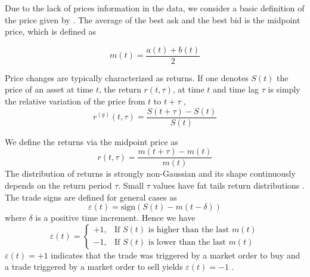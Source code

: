 Due to the lack of prices information in the data, we consider a basic
definition of the price given by
\cite{patterns_forex,political_forex,forex_liquidity}. The average of the best
ask and the best bid is the midpoint price, which is defined as
\cite{subtle_nature,Bouchaud_2004,teach_spread,large_prices_changes,my_paper_response_financial,em_stylized_facts,prop_order_book,stat_theory}

\begin{equation}
    m \left(t\right) = \frac{a\left(t\right) + b\left(t\right)}{2}
\end{equation}

Price changes are typically characterized as returns. If one denotes
$S\left( t\right)$ the price of an asset at time $t$, the return
$r\left(t, \tau\right)$, at time $t$ and time lag $\tau$ is simply the relative
variation of the price from $t$ to $t + \tau$
\cite{subtle_nature,empirical_facts,asynchrony_effects_corr,tick_size_impact,causes_epps_effect,non_stationarity},
\begin{equation}\label{eq:return_general}
    r^{\left(g\right)} \left(t, \tau \right) = \frac{S\left(t + \tau\right)
    - S\left(t\right)}{S\left(t\right)}
\end{equation}

We define the returns via the midpoint price as
\begin{equation}\label{eq:midpoint_price_return}
    r\left(t,\tau\right) = \frac{m\left(t+\tau\right)-m\left(t\right)}
    {m\left(t\right)}
\end{equation}
The distribution of returns is strongly non-Gaussian and its shape continuously
depends on the return period $\tau$. Small $\tau$ values have fat tails return
distributions \cite{subtle_nature}. The trade signs are defined for general
cases as
\begin{equation}\label{eq:trade_sign_general}
    \varepsilon\left(t\right)=\text{sign}\left(S\left(t\right)
    -m\left(t-\delta\right)\right)
\end{equation}
where $\delta$ is a positive time increment. Hence we have
\begin{equation}\label{eq:trade_sign_results}
    \varepsilon\left(t\right)=\left\{
    \begin{array}{cc}
    +1, & \text{If } S\left(t\right)
    \text{ is higher than the last } m\left( t \right)\\
    -1, & \text{If } S\left(t\right)
    \text{ is lower than the last } m\left( t \right)
    \end{array}\right.
\end{equation}
$\varepsilon(t) = +1$ indicates that the trade was triggered by a market order
to buy and a trade triggered by a market order to sell yields
$\varepsilon(t) = -1$
\cite{subtle_nature,Bouchaud_2004,spread_changes_affect,quant_stock_price_response,order_flow_persistent}.

